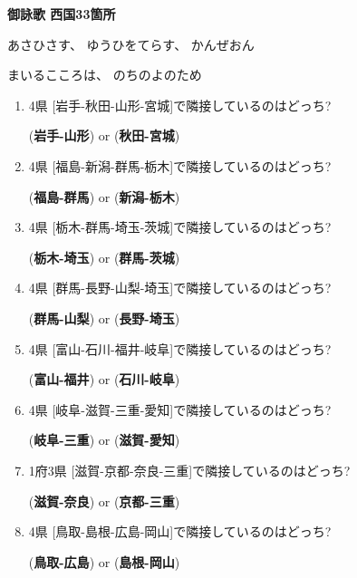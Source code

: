 \documentclass[11pt,a5paper]{ltjsarticle}
\begin{document}
\hrulefill
\textbf{御詠歌 西国33箇所}
\hrulefill

あさひさす、
ゆうひをてらす、
かんぜおん

まいるこころは、
のちのよのため

\begin{enumerate}
 \item
      4県 [岩手-秋田-山形-宮城]で隣接しているのはどっち?
      \begin{center}
       (\textbf{岩手-山形}) or (\textbf{秋田-宮城})
      \end{center}

 \item
      4県 [福島-新潟-群馬-栃木]で隣接しているのはどっち?
      \begin{center}
       (\textbf{福島-群馬}) or (\textbf{新潟-栃木})
      \end{center}

 \item
      4県 [栃木-群馬-埼玉-茨城]で隣接しているのはどっち?
      \begin{center}
       (\textbf{栃木-埼玉}) or (\textbf{群馬-茨城})
      \end{center}

 \item
      4県 [群馬-長野-山梨-埼玉]で隣接しているのはどっち?
      \begin{center}
       (\textbf{群馬-山梨}) or (\textbf{長野-埼玉})
      \end{center}

 \item
      4県 [富山-石川-福井-岐阜]で隣接しているのはどっち?
      \begin{center}
       (\textbf{富山-福井}) or (\textbf{石川-岐阜})
      \end{center}

 \item
      4県 [岐阜-滋賀-三重-愛知]で隣接しているのはどっち?
      \begin{center}
       (\textbf{岐阜-三重}) or (\textbf{滋賀-愛知})
      \end{center}

 \item
      1府3県 [滋賀-京都-奈良-三重]で隣接しているのはどっち?
      \begin{center}
       (\textbf{滋賀-奈良}) or (\textbf{京都-三重})
      \end{center}

 \item
      4県 [鳥取-島根-広島-岡山]で隣接しているのはどっち?
      \begin{center}
       (\textbf{鳥取-広島}) or (\textbf{島根-岡山})
      \end{center}


\end{enumerate}
\end{document}
